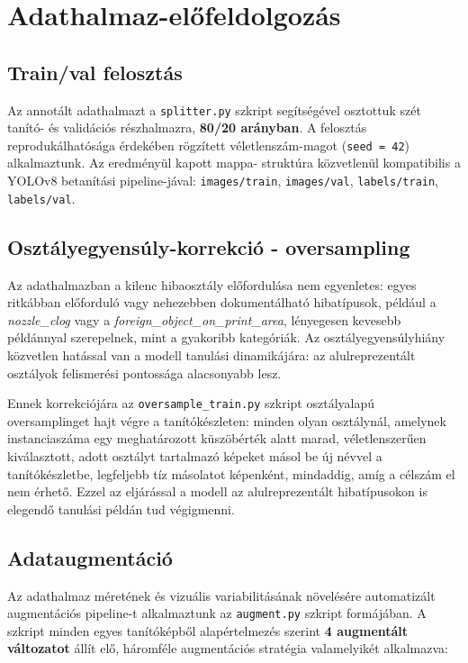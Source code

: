\section{Adathalmaz-előfeldolgozás}

    \subsection{Train/val felosztás}

    Az annotált adathalmazt a \texttt{splitter.py} szkript segítségével osztottuk szét tanító-
    és validációs részhalmazra, \textbf{80/20 arányban}. A felosztás reprodukálhatósága érdekében
    rögzített véletlenszám-magot (\texttt{seed = 42}) alkalmaztunk. Az eredményül kapott mappa-
    struktúra közvetlenül kompatibilis a YOLOv8 betanítási pipeline-jával:
    \texttt{images/train}, \texttt{images/val}, \texttt{labels/train}, \texttt{labels/val}.

    \subsection{Osztályegyensúly-korrekció - oversampling}

    Az adathalmazban a kilenc hibaosztály előfordulása nem egyenletes: egyes ritkábban előforduló
    vagy nehezebben dokumentálható hibatípusok, például a \textit{nozzle\_clog} vagy a
    \textit{foreign\_object\_on\_print\_area}, lényegesen kevesebb példánnyal szerepelnek,
    mint a gyakoribb kategóriák. Az osztályegyensúlyhiány közvetlen hatással van a modell
    tanulási dinamikájára: az alulreprezentált osztályok felismerési pontossága alacsonyabb lesz.

    Ennek korrekciójára az \texttt{oversample\_train.py} szkript osztályalapú oversamplinget
    hajt végre a tanítókészleten: minden olyan osztálynál, amelynek instanciaszáma egy meghatározott
    küszöbérték alatt marad, véletlenszerűen kiválasztott, adott osztályt tartalmazó képeket
    másol be új névvel a tanítókészletbe, legfeljebb tíz másolatot képenként, mindaddig,
    amíg a célszám el nem érhető. Ezzel az eljárással a modell az alulreprezentált hibatípusokon
    is elegendő tanulási példán tud végigmenni.

    \subsection{Adataugmentáció}

    Az adathalmaz méretének és vizuális variabilitásának növelésére automatizált augmentációs
    pipeline-t alkalmaztunk az \texttt{augment.py} szkript formájában. A szkript minden egyes
    tanítóképből alapértelmezés szerint \textbf{4 augmentált változatot} állít elő, háromféle
    augmentációs stratégia valamelyikét alkalmazva:

